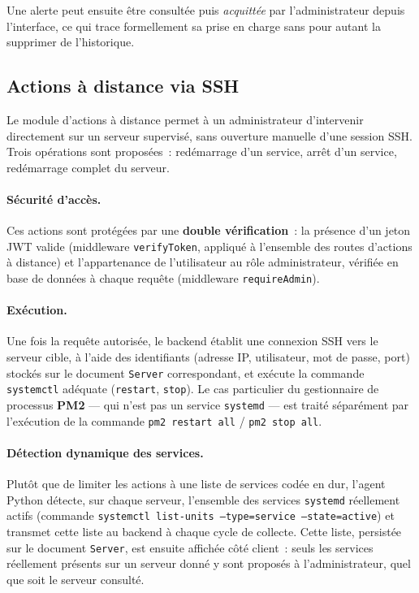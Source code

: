 Une alerte peut ensuite être consultée puis \emph{acquittée} par l'administrateur depuis l'interface, ce qui trace formellement sa prise en charge sans pour autant la supprimer de l'historique.

\subsection{Actions à distance via SSH}

Le module d'actions à distance permet à un administrateur d'intervenir directement sur un serveur supervisé, sans ouverture manuelle d'une session SSH. Trois opérations sont proposées~: redémarrage d'un service, arrêt d'un service, redémarrage complet du serveur.

\paragraph{Sécurité d'accès.} Ces actions sont protégées par une \textbf{double vérification}~: la présence d'un jeton JWT valide (middleware \texttt{verifyToken}, appliqué à l'ensemble des routes d'actions à distance) et l'appartenance de l'utilisateur au rôle administrateur, vérifiée en base de données à chaque requête (middleware \texttt{requireAdmin}).

\paragraph{Exécution.} Une fois la requête autorisée, le backend établit une connexion SSH vers le serveur cible, à l'aide des identifiants (adresse IP, utilisateur, mot de passe, port) stockés sur le document \texttt{Server} correspondant, et exécute la commande \texttt{systemctl} adéquate (\texttt{restart}, \texttt{stop}). Le cas particulier du gestionnaire de processus \textbf{PM2} — qui n'est pas un service \texttt{systemd} — est traité séparément par l'exécution de la commande \texttt{pm2 restart all} / \texttt{pm2 stop all}.

\paragraph{Détection dynamique des services.} Plutôt que de limiter les actions à une liste de services codée en dur, l'agent Python détecte, sur chaque serveur, l'ensemble des services \texttt{systemd} réellement actifs (commande \texttt{systemctl list-units --type=service --state=active}) et transmet cette liste au backend à chaque cycle de collecte. Cette liste, persistée sur le document \texttt{Server}, est ensuite affichée côté client~: seuls les services réellement présents sur un serveur donné y sont proposés à l'administrateur, quel que soit le serveur consulté.

